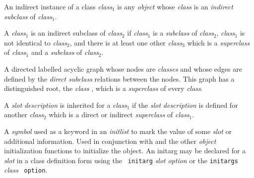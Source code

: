 \begin{optDefinition}
\begin{definitions}
     An indirect instance of a
    class {\em class$_1$} is any {\em object} whose {\em class} is an {\em
        indirect} {\em subclass} of {\em class$_1$}.


     A {\em class$_1$} is an
    indirect subclass of {\em class$_2$} if {\em class$_1$} is a {\em subclass}
    of {\em class$_2$}, {\em class$_1$} is not identical to {\em class$_2$}, and
    there is at least one other {\em class$_3$} which is a {\em superclass} of
    {\em class$_1$} and a {\em subclass} of {\em class$_2$}.

      A directed
    labelled acyclic graph whose nodes are {\em classes} and whose edges are
    defined by the {\em direct subclass} relations between the nodes.  This
    graph has a distinguished root, the {\em class} , which is a
    {\em superclass} of every {\em class}.

     A {\em slot} {\em description} is inherited for a {\em
        class$_1$} if the {\em slot} {\em description} is defined for another
    {\em class$_2$} which is a direct or indirect {\em superclass} of {\em
        class$_1$}.

      A {\em symbol} used as a
    keyword in an {\em initlist} to mark the value of some {\em slot} or
    additional information.  Used in conjunction with  and the other
    {\em object} initialization functions to initialize the object.  An initarg
    may be declared for a {\em slot} in a class definition form using the {\tt
        initarg} {\em slot} {\em option} or the {\tt initargs} {\em class} {\tt
        option}.


\end{definitions}
\end{optDefinition}
